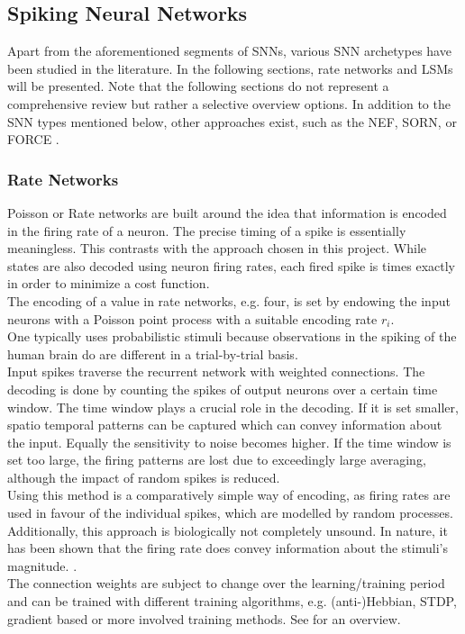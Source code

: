\subsection{Spiking Neural Networks}\label{sec:spiking-neural-networks}
Apart from the aforementioned segments of \acp{SNN}, various \ac{SNN} archetypes have been studied in the literature. In the following sections, rate networks and \acp{LSM} will be presented. Note that the following sections do not represent a comprehensive review but rather a selective overview options. In addition to the \ac{SNN} types mentioned below, other approaches exist, such as the \ac{NEF}\cite{eliasmith_neural_2004}, SORN\cite{lazar_sorn_2009}, or FORCE \cite{nicola_supervised_2017}.
\subsubsection{Rate Networks}
Poisson or Rate networks are built around the idea that information is encoded in the firing rate of a neuron. The precise timing of a spike is essentially meaningless\cite{brette_philosophy_2015}. This contrasts with the approach chosen in this project. While states are also decoded using neuron firing rates, each fired spike is times exactly in order to minimize a cost function.\\
The encoding of a value in rate networks, e.g. four, is set by endowing the input neurons with a Poisson point process with a suitable encoding rate $r_i$\cite{deneve_efficient_2016}.\\
One typically uses probabilistic stimuli because observations in the spiking of the human brain do are different in a trial-by-trial basis.\\
Input spikes traverse the recurrent network with weighted connections. The decoding is done by counting the spikes of output neurons over a certain time window. The time window plays a crucial role in the decoding. If it is set smaller, spatio temporal patterns can be captured which can convey information about the input. Equally the sensitivity to noise becomes higher. If the time window is set too large, the firing patterns are lost due to exceedingly large averaging, although the impact of random spikes is reduced.\\
Using this method is a comparatively simple way of encoding, as firing rates are used in favour of the individual spikes, which are modelled by random processes. Additionally, this approach is biologically not completely unsound. In nature, it has been shown that the firing rate does convey information about the stimuli's magnitude. \cite{adrian_impulses_1926}.\\
The connection weights are subject to change over the learning/training period\cite{almomani_comparative_2019} and can be trained with different training algorithms, e.g. (anti-)Hebbian, \ac{STDP}, gradient based or more involved training methods\cite{demin_recurrent_2018}. See \cite{yi_learning_2023} for an overview.\\


